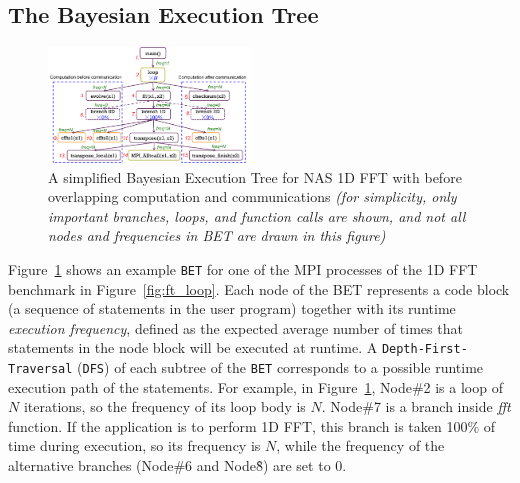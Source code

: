 \subsection {The Bayesian Execution Tree}

\begin{figure}[h]
\begin{center}
\includegraphics[width=0.48\textwidth]{fig/ft_bet.png}
\caption{A simplified Bayesian Execution Tree for NAS 1D FFT with before overlapping computation and communications
  \emph{(for simplicity, only important branches, loops, and function calls are shown, and not all nodes and frequencies in BET are drawn in this figure)}
}
\label{fig:ft_bet}
\end{center}
\end{figure}

Figure~\ref{fig:ft_bet} shows an example \texttt{BET} for one of the MPI processes of the 1D FFT benchmark in Figure~\ref{fig:ft_loop}.
Each node of the BET represents a code block (a sequence of statements in the user program) together with its runtime \emph{execution frequency}, defined as the expected average number of times that statements in the node block will be executed at runtime.
A \texttt{Depth-First-Traversal} (\texttt{DFS}) of each subtree of the \texttt{BET} corresponds to a possible runtime execution path of the statements.
For example, in Figure~\ref{fig:ft_bet}, Node\#2 is a loop of $N$ iterations, so the frequency of its loop body is $N$.
Node\#7 is a branch inside {\em fft} function. If the application is to perform 1D FFT,  this branch is taken 100\% of time during execution,
so its frequency is $N$, while the frequency of the alternative branches (Node\#6 and Node\^8) are set to 0.



